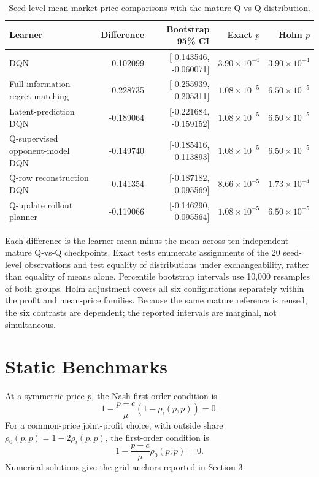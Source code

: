 \documentclass[11pt]{article}
\begin{document}
\begin{table}[H]
\centering
\caption{Seed-level mean-market-price comparisons with the mature Q-vs-Q
distribution.}
\scriptsize
\begin{tabular}{lrrrr}
\toprule
Learner & Difference & Bootstrap 95\% CI & Exact \(p\) & Holm \(p\) \\
\midrule
DQN & -0.102099 & [-0.143546, -0.060071] & \(3.90{\times}10^{-4}\) & \(3.90{\times}10^{-4}\) \\
Full-information regret matching & -0.228735 & [-0.255939, -0.205311] & \(1.08{\times}10^{-5}\) & \(6.50{\times}10^{-5}\) \\
Latent-prediction DQN & -0.189064 & [-0.221684, -0.159152] & \(1.08{\times}10^{-5}\) & \(6.50{\times}10^{-5}\) \\
Q-supervised opponent-model DQN & -0.149740 & [-0.185416, -0.113893] & \(1.08{\times}10^{-5}\) & \(6.50{\times}10^{-5}\) \\
Q-row reconstruction DQN & -0.141354 & [-0.187182, -0.095569] & \(8.66{\times}10^{-5}\) & \(1.73{\times}10^{-4}\) \\
Q-update rollout planner & -0.119066 & [-0.146290, -0.095564] & \(1.08{\times}10^{-5}\) & \(6.50{\times}10^{-5}\) \\
\bottomrule
\end{tabular}
\end{table}

Each difference is the learner mean minus the mean across ten independent
mature Q-vs-Q checkpoints. Exact tests enumerate assignments of the 20
seed-level observations and test equality of distributions under
exchangeability, rather than equality of means alone. Percentile bootstrap
intervals use 10,000 resamples of both groups. Holm adjustment covers all six
configurations separately within the profit and mean-price families. Because
the same mature reference is reused, the six contrasts are dependent; the
reported intervals are marginal, not simultaneous.

\section{Static Benchmarks}

At a symmetric price \(p\), the Nash first-order condition is
\[
1-\frac{p-c}{\mu}(1-\rho_i(p,p))=0.
\]
For a common-price joint-profit choice, with outside share
\(\rho_0(p,p)=1-2\rho_i(p,p)\), the first-order condition is
\[
1-\frac{p-c}{\mu}\rho_0(p,p)=0.
\]
Numerical solutions give the grid anchors reported in Section 3.
\end{document}
